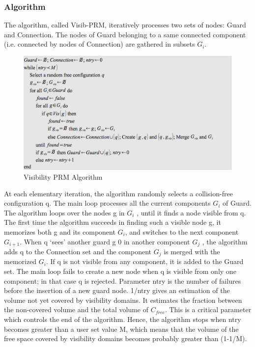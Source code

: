 \documentclass[11pt]{article}
\begin{document}
\subsubsection{Algorithm}
The algorithm, called Visib-PRM, iteratively processes two sets of nodes: Guard
and Connection. The nodes of Guard belonging to a same connected component
(i.e. connected by nodes of Connection) are gathered in subsets $G_i$.

\begin{figure}[h]
\includegraphics{visibility_psm_code}
\centering
\caption{Visibility PRM Algorithm}
\label{fig:vispsm_alg}
\end{figure}
At each elementary iteration, the algorithm randomly selects a collision-free
configuration q. The main loop processes all the current components $G_i$ of Guard. The algorithm loops over the nodes g in $G_i$ , until it finds a node visible from q. The
first time the algorithm succeeds in finding such a visible node g, it memorizes both
g and its component $G_i$, and switches to the next component $G_{i+1}$. When q ‘sees’
another guard g
0 in another component $G_j$ , the algorithm adds q to the Connection
set and the component $G_j$ is merged with the memorized $G_i$. If q is not visible from
any component, it is added to the Guard set. The main loop fails to create a new
node when q is visible from only one component; in that case q is rejected.
Parameter ntry is the number of failures before the insertion of a new guard node.
1/ntry gives an estimation of the volume not yet covered by visibility domains.
It estimates the fraction between the non-covered volume and the total volume of
$C_{free}$. This is a critical parameter which controls the end of the algorithm. Hence,
the algorithm stops when ntry becomes greater than a user set value M, which
means that the volume of the free space covered by visibility domains becomes
probably greater than (1-1/M).
\end{document}
